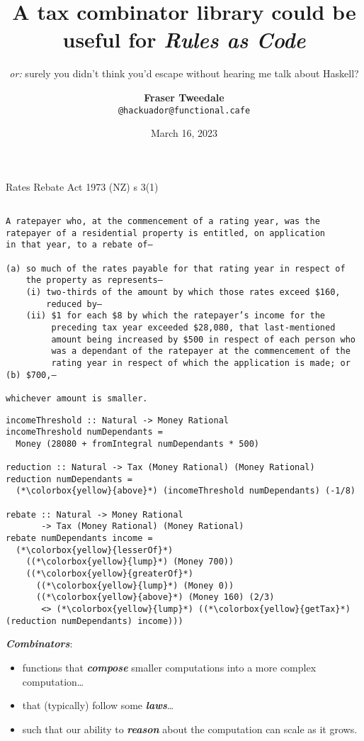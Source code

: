 \documentclass[ignorenonframetext,aspectratio=169,12pt]{beamer}
\title{\bf A tax combinator library could be useful for {\em Rules as Code}}
\subtitle{\footnotesize {\em or:} surely you didn't think you'd escape without hearing me talk about Haskell?}
\author{{\bf Fraser Tweedale}\\
    \texttt{@hackuador@functional.cafe}}
\date{March 16, 2023}
\begin{document}
\frame{\titlepage}

\begin{frame}[fragile]{Rates Rebate Act 1973 (NZ) s 3(1)}
\footnotesize
\begin{verbatim}

A ratepayer who, at the commencement of a rating year, was the
ratepayer of a residential property is entitled, on application
in that year, to a rebate of—

(a) so much of the rates payable for that rating year in respect of
    the property as represents—
    (i) two-thirds of the amount by which those rates exceed $160,
        reduced by—
    (ii) $1 for each $8 by which the ratepayer’s income for the
         preceding tax year exceeded $28,080, that last-mentioned
         amount being increased by $500 in respect of each person who
         was a dependant of the ratepayer at the commencement of the
         rating year in respect of which the application is made; or
(b) $700,—

whichever amount is smaller.

\end{verbatim}

\end{frame}

\begin{frame}[fragile]{}

\begin{lstlisting}[basicstyle=\ttfamily\footnotesize]
incomeThreshold :: Natural -> Money Rational
incomeThreshold numDependants =
  Money (28080 + fromIntegral numDependants * 500)

reduction :: Natural -> Tax (Money Rational) (Money Rational)
reduction numDependants =
  (*\colorbox{yellow}{above}*) (incomeThreshold numDependants) (-1/8)

rebate :: Natural -> Money Rational
       -> Tax (Money Rational) (Money Rational)
rebate numDependants income =
  (*\colorbox{yellow}{lesserOf}*)
    ((*\colorbox{yellow}{lump}*) (Money 700))
    ((*\colorbox{yellow}{greaterOf}*)
      ((*\colorbox{yellow}{lump}*) (Money 0))
      ((*\colorbox{yellow}{above}*) (Money 160) (2/3)
       <> (*\colorbox{yellow}{lump}*) ((*\colorbox{yellow}{getTax}*) (reduction numDependants) income)))
\end{lstlisting}

\end{frame}

\begin{frame}[plain]{}
\textbf{\em Combinators}:
\begin{itemize}
  \item functions that \textbf{\em compose} smaller computations into
    a more complex computation\ldots{}
  \item that (typically) follow some \textbf{\em laws}\ldots{}
  \item such that our ability to \textbf{\em reason} about the computation can
    scale as it grows.
\end{itemize}
\end{frame}
\end{document}
